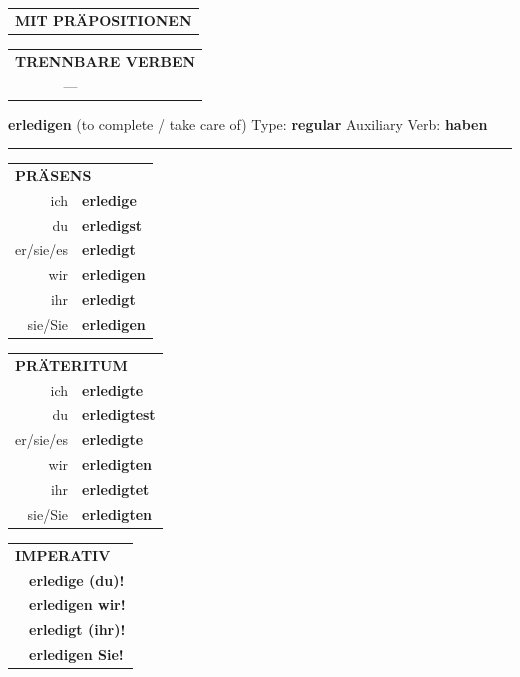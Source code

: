 \documentclass[10pt,a4paper]{revtex4-2}
\begin{document}
\begin{verbbox-acc}
\vspace{10pt}

\begin{tabular}{lll}
\multicolumn{3}{l}{\textbf{MIT PRÄPOSITIONEN}}\\
\end{tabular}
\hfill
\begin{tabular}{lll}
\multicolumn{3}{l}{\textbf{TRENNBARE VERBEN}}\\
& ---\\
\end{tabular}

\vspace{-5pt}
\end{verbbox-acc}


\begin{verbbox}
{\Large \bf erledigen} (to complete / take care of) \hfill Type: \textbf{regular} \hfill Auxiliary Verb: \textbf{haben} 

\vspace{5pt}
\hrule
\vspace{5pt}

\begin{tabular}{rl}
\multicolumn{2}{l}{\textbf{PRÄSENS}}\\
ich & \textbf{erledige}\\
du & \textbf{erledigst}\\
er/sie/es & \textbf{erledigt}\\
wir & \textbf{erledigen}\\
ihr & \textbf{erledigt}\\
sie/Sie & \textbf{erledigen}\\
\end{tabular}
\hfill
\begin{tabular}{rl}
\multicolumn{2}{l}{\textbf{PRÄTERITUM}}\\
ich & \textbf{erledigte}\\
du & \textbf{erledigtest}\\
er/sie/es & \textbf{erledigte}\\
wir & \textbf{erledigten}\\
ihr & \textbf{erledigtet}\\
sie/Sie & \textbf{erledigten}\\
\end{tabular}
\hfill
\begin{tabular}{rl}
\multicolumn{2}{l}{\textbf{IMPERATIV}}\\
& \textbf{erledige (du)!}\\
& \textbf{erledigen wir!}\\
& \textbf{erledigt (ihr)!}\\
& \textbf{erledigen Sie!}\\
\end{tabular}


\end{verbbox}
\end{document}
